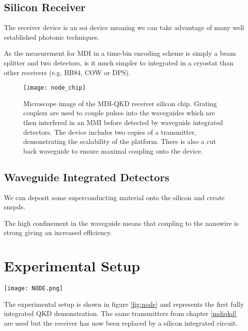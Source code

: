 \subsection{Silicon Receiver}

The receiver device is an \ac{soi} device meaning we can take advantage of many well established photonic techniques.

As the measurement for \ac{MDI} in a time-bin encoding scheme is simply a beam splitter and two detectors, is it much simpler to integrated in a cryostat than other receivers (e.g. BB84, COW or DPS).

\begin{figure}[tbp]
	\centering
	\texttt{[image: node\_chip]}
	\caption[Silicon MDI-QKD receiver]{Microscope image of the MDI-QKD receiver silicon chip. Grating couplers are used to couple pulses into the waveguides which are then interfered in an MMI before detected by waveguide integrated detectors. The device includes two copies of a transmitter, demonstrating the scalability of the platform. There is also a cut back waveguide to ensure maximal coupling onto the device.}
	\label{fig:node_chip}
\end{figure}

\subsection{Waveguide Integrated Detectors}

We can deposit some superconducting material onto the silicon and create \acp{snspd}. 

The high confinement in the waveguide means that coupling to the nanowire is strong giving an increased efficiency. 

\section{Experimental Setup}

\begin{sidewaysfigure}
	\centering
	\texttt{[image: NODE.png]}
	\caption[Fully integrated QKD setup]{Experimental setup for fully integrated quantum key distribution. Alice and Bob use independent InP devices which generate BB84 states on-chip. The receiver (Charlie) is an SOI device with grating couplers and waveguide-integrated detectors.}
	\label{fig:node}
\end{sidewaysfigure}

The experimental setup is shown in figure \ref{fig:node} and represents the first fully integrated \ac{QKD} demonstration. The same transmitters from chapter \ref{mdiqkd} are used but the receiver has now been replaced by a silicon integrated circuit. 

